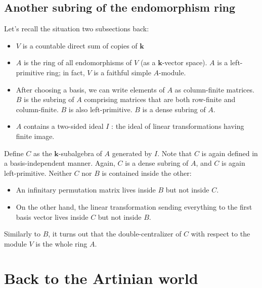 \documentclass[a4paper]{amsart}
\newcommand{\field}{\mathbf{k}}
\begin{document}
\subsection{Another subring of the endomorphism ring}

Let's recall the situation two subsections back:

\begin{itemize}

\item $V$ is a countable direct sum of copies of $\field$

\item $A$ is the ring of all endomorphisms of $V$ (as a
  $\field$-vector space). $A$ is a left-primitive ring; in fact, $V$
  is a faithful simple $A$-module.

\item After choosing a basis, we can write elements of $A$ as
  column-finite matrices. $B$ is the subring of $A$ comprising
  matrices that are both row-finite and column-finite. $B$ is also
  left-primitive. $B$ is a dense subring of $A$.

\item $A$ contains a two-sided ideal $I$ : the ideal of linear
  transformations having finite image.

\end{itemize}

Define $C$ as the $\field$-subalgebra of $A$ generated by $I$. Note
that $C$ is again defined in a basis-independent manner. Again, $C$ is
a dense subring of $A$, and $C$ is again left-primitive. Neither $C$
nor $B$ is contained inside the other:

\begin{itemize}

\item An infinitary permutation matrix lives inside $B$ but not inside $C$.

\item On the other hand, the linear transformation sending everything
  to the first basis vector lives inside $C$ but not inside $B$.

\end{itemize}

Similarly to $B$, it turns out that the double-centralizer of $C$ with
respect to the module $V$ is the whole ring $A$.
\section{Back to the Artinian world}
\end{document}
